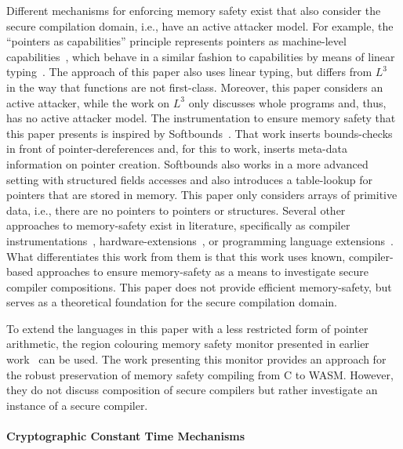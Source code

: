 \documentclass[dvipsnames,conference]{IEEEtran}
\theoremstyle{definition}
\begin{document}
Different mechanisms for enforcing memory safety exist that also consider the secure compilation domain, i.e., have an active attacker model.
For example, the ``pointers as capabilities'' principle represents pointers as machine-level capabilities~\cite{korashy2021capableptrs}, which behave in a similar fashion to capabilities by means of linear typing~\cite{morrisett2005L3}.
The approach of this paper also uses linear typing, but differs from $L^{3}$~\cite{morrisett2005L3} in the way that functions are not first-class.
Moreover, this paper considers an active attacker, while the work on $L^{3}$ only discusses whole programs and, thus, has no active attacker model.
The instrumentation to ensure memory safety that this paper presents is inspired by Softbounds~\cite{nagarakatte2009soft}.
That work inserts bounds-checks in front of pointer-dereferences and, for this to work, inserts meta-data information on pointer creation.
Softbounds also works in a more advanced setting with structured fields accesses and also introduces a table-lookup for pointers that are stored in memory.
This paper only considers arrays of primitive data, i.e., there are no pointers to pointers or structures.
Several other approaches to memory-safety exist in literature, specifically as compiler instrumentations~\cite{akritidis2009baggy,younan2010paricheck,jung2021pico,shankaranarayana2023tailcheck,dhumbumroong2020boundwarden,nam2019framer,zhou2023fatptrs}, hardware-extensions~\cite{kwon2013lowfat,saileshwar2022heapcheck,chen2023flexpointer,kim2023whistle}, or programming language extensions~\cite{elliott2018checkedc,li2022formalcheckedc,jim2002cyclone,elliott2015guilt,west2005cuckoo,weis2019fyr,benoit2019uniqueness}.
What differentiates this work from them is that this work uses known, compiler-based approaches to ensure memory-safety as a means to investigate secure compiler compositions.
This paper does not provide efficient memory-safety, but serves as a theoretical foundation for the secure compilation domain.

To extend the languages in this paper with a less restricted form of pointer arithmetic, the region colouring memory safety monitor presented in earlier work~\cite{michael2023mswasm} can be used.
The work presenting this monitor provides an approach for the robust preservation of memory safety compiling from C to WASM.
However, they do not discuss composition of secure compilers but rather investigate an instance of a secure compiler.

\paragraph*{Cryptographic Constant Time Mechanisms}\label{subsec:relw:cctmechs}
\end{document}
